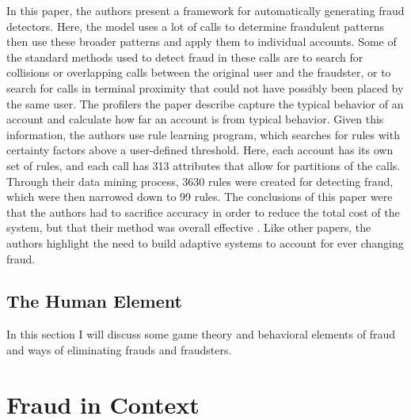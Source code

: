 \documentclass[midd]{thesis}
\begin{document}
In this paper, the authors present a framework for automatically generating fraud detectors. Here, the model uses a lot of calls to determine fraudulent patterns then use these broader patterns and apply them to individual accounts. Some of the standard methods used to detect fraud in these calls are to search for collisions or overlapping calls between the original user and the fraudster, or to search for calls in terminal proximity that could not have possibly been placed by the same user. The profilers the paper describe capture the typical behavior of an account and calculate how far an account is from typical behavior. Given this information, the authors use rule learning program, which searches for rules with certainty factors above a user-defined threshold. Here, each account has its own set of rules, and each call has 313 attributes that allow for partitions of the calls. Through their data mining process, 3630 rules were created for detecting fraud, which were then narrowed down to 99 rules. The conclusions of this paper were that the authors had to sacrifice accuracy in order to reduce the total cost of the system, but that their method was overall effective \cite{Fawcett1996}. Like other papers, the authors highlight the need to build adaptive systems to account for ever changing fraud.



\section{The Human Element}

In this section I will discuss some game theory and behavioral elements of fraud and ways of eliminating frauds and fraudsters.



\noindent
%
%

\pagebreak
\chapter{ Fraud in Context}
\label{sec:context}
\end{document}
